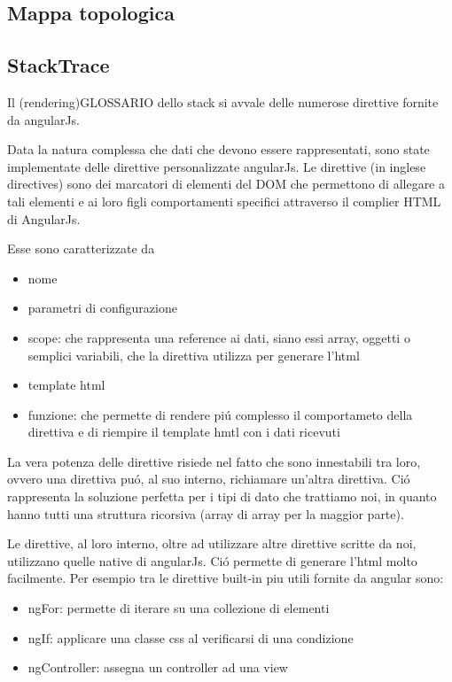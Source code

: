 \subsection{Mappa topologica}

\subsection{StackTrace}
	Il (rendering)GLOSSARIO dello stack si avvale delle numerose direttive fornite da
angularJs.


Data la natura complessa che dati che devono essere rappresentati, sono state
implementate delle direttive personalizzate angularJs.
Le direttive (in inglese directives) sono dei marcatori di elementi del DOM che permettono di allegare
a tali elementi e ai loro figli comportamenti specifici attraverso il complier
HTML di AngularJs.

Esse sono  caratterizzate da
	\begin{itemize}
		\item nome
		\item parametri di configurazione
		\item scope:  che rappresenta una reference ai dati, siano essi array, oggetti o
				semplici variabili, che la direttiva utilizza per generare l'html
		\item template html
		\item funzione: che permette di rendere piú complesso il comportameto della direttiva
					e di riempire il template hmtl con i dati ricevuti
	\end{itemize}

La vera potenza delle direttive risiede nel fatto che sono innestabili tra loro,
ovvero una direttiva puó, al suo interno, richiamare un'altra direttiva. Ció
rappresenta la soluzione perfetta per i tipi di dato che trattiamo noi, in quanto
hanno tutti una struttura ricorsiva (array di array per la maggior parte).

Le direttive, al loro interno, oltre ad utilizzare altre direttive scritte da noi,
utilizzano quelle native di angularJs. Ció permette di generare l'html molto
facilmente. Per esempio tra le direttive built-in piu utili fornite da angular sono:
\begin{itemize}
	\item ngFor: permette di iterare su una collezione di elementi
	\item ngIf: applicare una classe css al verificarsi di una condizione
	\item ngController: assegna un controller ad una view
\end{itemize}

